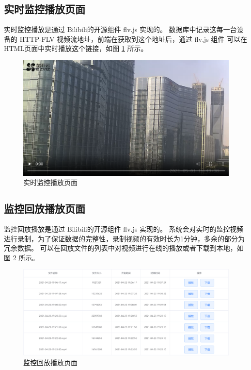 \subsection{实时监控播放页面}
实时监控播放是通过 Bilibili的开源组件 flv.js 实现的。
数据库中记录这每一台设备的 HTTP-FLV 视频流地址，前端在获取到这个地址后，通过 flv.js 组件
可以在HTML页面中实时播放这个链接，如图 \ref{Fig:record_eg} 所示。

\begin{figure}[ht]
    \centering
    \includegraphics[width=1\linewidth]{./Figure/IMG_record_eg.png}
    \caption{实时监控播放页面}\label{Fig:record_eg}
\end{figure}

\newpage
\subsection{监控回放播放页面}
监控回放播放是通过 Bilibili的开源组件 flv.js 实现的。
系统会对实时的监控视频进行录制，为了保证数据的完整性，录制视频的有效时长为1分钟，多余的部分为冗余数据。
可以在回放文件的列表中对视频进行在线的播放或者下载到本地，如图 \ref{Fig:file_list} 所示。

\begin{figure}[ht]
    \centering
    \includegraphics[width=1\linewidth]{./Figure/IMG_file_list.png}
    \caption{监控回放播放页面}\label{Fig:file_list}
\end{figure}

